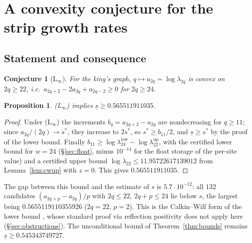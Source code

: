 \documentclass[11pt]{amsart}
\newtheorem{proposition}[theorem]{Proposition}
\newtheorem{conjecture}[theorem]{Conjecture}
\theoremstyle{definition}
\theoremstyle{remark}
\begin{document}
\section{A convexity conjecture for the strip growth rates}\label{sec:L}

\subsection{Statement and consequence}
\begin{conjecture}[L$_\infty$]\label{conj:Linf}
For the king's graph, $q \mapsto a_{2q} = \log\lambda_{2q}$ is convex on $2q \ge 22$, i.e.\
$a_{2q+2} - 2a_{2q} + a_{2q-2} \ge 0$ for $2q \ge 24$.
\end{conjecture}

\begin{proposition}\label{prop:cond}
(L$_\infty$) implies $\underline s \ge 0.565511911035$.
\end{proposition}
\begin{proof}
Under (L$_\infty$) the increments $b_q = a_{2q+2} - a_{2q}$ are nondecreasing for
$q \ge 11$; since $a_{2q}/(2q) \to s^*$, they increase to $2s^*$, so $s^* \ge b_{11}/2$, and
$\underline s \ge s^*$ by the proof of the lower bound. Finally $b_{11} \ge \log\lambda_{24}^{\mathrm{low}}
- \log\lambda_{22}^{\mathrm{up}}$, with the certified lower bound for $w = 24$ (\S\ref{sec:float},
minus $10^{-14}$ for the float storage of the per-site value) and a certified upper bound
$\log\lambda_{22} \le 11.95722617139012$ from Lemma~\ref{lem:cwup} with $z = 0$. This gives
$0.565511911035$.
\end{proof}

The gap between this bound and the estimate of $s$ is $5.7\cdot10^{-12}$: all $132$ candidates
$(a_{2q+p} - a_{2q})/p$ with $2q \le 22$, $2q + p \le 24$ lie below $s$, the largest being
$0.5655119110355926$ ($2q = 22$, $p = 2$). This is the Calkin--Wilf form of the lower bound
\cite{calkinwilf1998}, whose standard proof via reflection positivity does not apply here
(\S\ref{sec:obstructions}). The unconditional bound of Theorem~\ref{thm:bounds} remains
$\underline s \ge 0.545343749727$.
\end{document}

